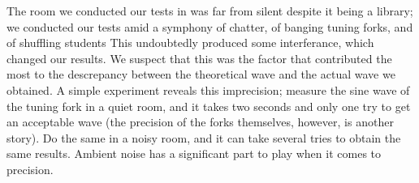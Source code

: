 \documentclass[12pt,oneside]{article}
\begin{document}
The room we conducted our tests in was far from silent despite it being
a library; we conducted our tests amid a symphony of chatter, of banging
tuning forks, and of shuffling students This undoubtedly produced some
interferance, which changed our results. We suspect that this was the
factor that contributed the most to the descrepancy between the
theoretical wave and the actual wave we obtained. A simple experiment
reveals this imprecision; measure the sine wave of the tuning fork in a
quiet room, and it takes two seconds and only one try to get an
acceptable wave (the precision of the forks themselves, however, is
another story). Do the same in a noisy room, and it can take several
tries to obtain the same results. Ambient noise has a significant part
to play when it comes to precision.

\color{black}

\partthree
\end{document}
